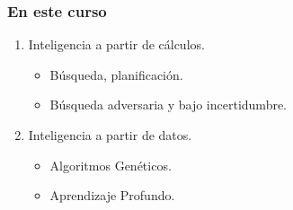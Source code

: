 \documentclass[10pt]{beamer}
\begin{document}
\begin{frame}
    \frametitle{En este curso}
    \begin{enumerate}
        \item Inteligencia a partir de cálculos.
            \begin{itemize}
                \item Búsqueda, planificación.
                \item Búsqueda adversaria y bajo incertidumbre.
            \end{itemize}
        \item Inteligencia a partir de datos.
            \begin{itemize}
                \item Algoritmos Genéticos.
                \item Aprendizaje Profundo.
            \end{itemize}
    \end{enumerate}
\end{frame}
\end{document}
